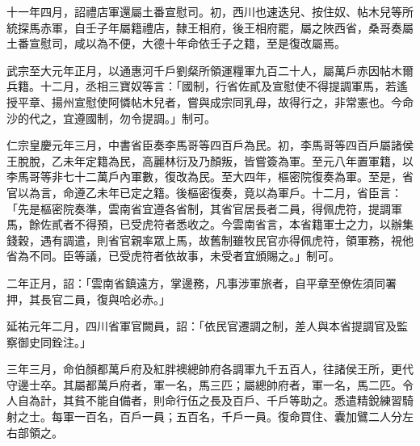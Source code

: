 \begin{pinyinscope}
 十一年四月，詔禮店軍還屬土番宣慰司。初，西川也速迭兒、按住奴、帖木兒等所統探馬赤軍，自壬子年屬籍禮店，隸王相府，後王相府罷，屬之陜西省，桑哥奏屬土番宣慰司，咸以為不便，大德十年命依壬子之籍，至是復改屬焉。



 武宗至大元年正月，以通惠河千戶劉粲所領運糧軍九百二十人，屬萬戶赤因帖木爾兵籍。十二月，丞相三寶奴等言：「國制，行省佐貳及宣慰使不得提調軍馬，若遙授平章、揚州宣慰使阿憐帖木兒者，嘗與成宗同乳母，故得行之，非常憲也。今命沙的代之，宜遵國制，勿令提調。」制可。



 仁宗皇慶元年三月，中書省臣奏李馬哥等四百戶為民。初，李馬哥等四百戶屬諸侯王脫脫，乙未年定籍為民，高麗林衍及乃顏叛，皆嘗簽為軍。至元八年置軍籍，以李馬哥等非七十二萬戶內軍數，復改為民。至大四年，樞密院復奏為軍。至是，省官以為言，命遵乙未年已定之籍。後樞密復奏，竟以為軍戶。十二月，省臣言：「先是樞密院奏準，雲南省宜遵各省制，其省官居長者二員，得佩虎符，提調軍馬，餘佐貳者不得預，已受虎符者悉收之。今雲南省言，本省籍軍士之力，以辦集錢穀，遇有調遣，則省官親率眾上馬，故舊制雖牧民官亦得佩虎符，領軍務，視他省為不同。臣等議，已受虎符者依故事，未受者宜頒賜之。」制可。



 二年正月，詔：「雲南省鎮遠方，掌邊務，凡事涉軍旅者，自平章至僚佐須同署押，其長官二員，復與哈必赤。」



 延祐元年二月，四川省軍官闕員，詔：「依民官遷調之制，差人與本省提調官及監察御史同銓注。」



 三年三月，命伯顏都萬戶府及紅胖襖總帥府各調軍九千五百人，往諸侯王所，更代守邊士卒。其屬都萬戶府者，軍一名，馬三匹；屬總帥府者，軍一名，馬二匹。令人自為計，其貧不能自備者，則命行伍之長及百戶、千戶等助之。悉遣精銳練習騎射之士。每軍一百名，百戶一員；五百名，千戶一員。復命買住、囊加鷿二人分左右部領之。



\end{pinyinscope}